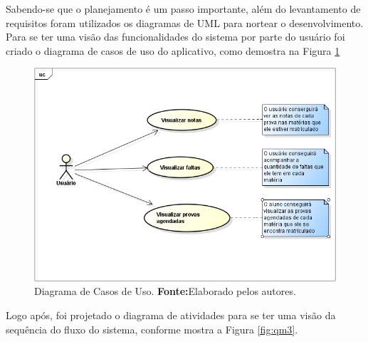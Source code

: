 \par Sabendo-se que o planejamento é um passo importante, além do levantamento
de requisitos foram utilizados os diagramas de UML para nortear o
desenvolvimento. Para se ter uma visão das funcionalidades do sistema por parte
do usuário foi criado o diagrama de casos de uso do aplicativo, como demostra
na Figura \ref{fig:qm2}
		
		\begin{figure}[h!]
			\centerline{\includegraphics[scale=0.4]{./imagens/2_q_metodologico/qm2.png}}
			\caption[Diagrama de Casos de Uso]{Diagrama de Casos de Uso.
			 \textbf{Fonte:}Elaborado pelos autores.}
			\label{fig:qm2}
		\end{figure}
		
	\par Logo após, foi projetado o diagrama de atividades para se ter uma visão
da sequência do fluxo do sistema, conforme mostra a Figura \ref{fig:qm3}.
		
